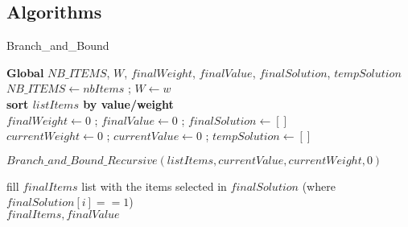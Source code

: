 \documentclass[a4paper, 11pt]{article}
\begin{document}
\subsection{Algorithms}
\begin{algorithm}[hbt!]
    \caption{Branch\_and\_Bound}\label{alg:two}
    
    \BlankLine
    \textbf{Global} $NB\_ITEMS$, $W$, $finalWeight$, $finalValue$, $finalSolution$, $tempSolution$\\
    
    \BlankLine
    $NB\_ITEMS \leftarrow nbItems$ ; 
    $W \leftarrow w$\\
    \textbf{sort $listItems$ by value/weight}\\
    $finalWeight \leftarrow 0$ ; 
    $finalValue \leftarrow 0$ ; 
    $finalSolution \leftarrow []$\\
    $currentWeight \leftarrow 0$ ; 
    $currentValue \leftarrow 0$ ; 
    $tempSolution \leftarrow []$\\
    
    \BlankLine
    $Branch\_and\_Bound\_Recursive(listItems,currentValue, currentWeight, 0)$
    
    \BlankLine
    fill $finalItems$ list with the items selected in $finalSolution$ (where $finalSolution[i] == 1$)\\
    \Return $finalItems, finalValue$
    
    
\end{algorithm}
\end{document}
